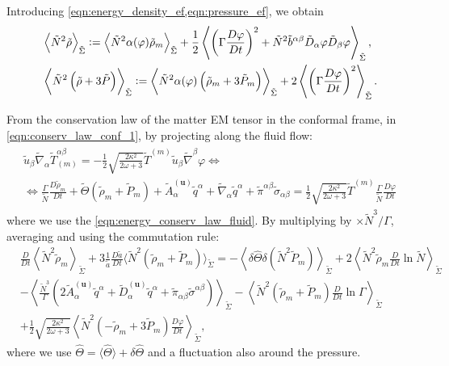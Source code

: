 Introducing \cref{eqn:energy_density_ef,eqn:pressure_ef}, we obtain
\begin{align}
    &\left\langle \Tilde{N}^2\Tilde{\rho}\right\rangle_{\Tilde{\Sigma}} := \left\langle \tilde{N}^2 \alpha(\varphi)\tilde{\rho}_m \right\rangle_{\Tilde{\Sigma}}+\frac{1}{2}\left\langle \left(\Gamma\frac{D\varphi}{Dt}\right)^2+\tilde{N}^2 \tilde{b}^{\alpha\beta}\tilde{D}_\alpha\varphi \tilde{D}_\beta\varphi\right\rangle_{\tilde{\Sigma}}, \\
    &\left\langle \Tilde{N}^2\left(\Tilde{\rho}+3\Tilde{P}\right)\right\rangle_{\Tilde{\Sigma}} := \left\langle \tilde{N}^2 \alpha(\varphi)\left(\tilde{\rho}_m+3\tilde{P}_m\right) \right\rangle_{\Tilde{\Sigma}}+2\left\langle \left(\Gamma\frac{D\varphi}{Dt}\right)^2 \right\rangle_{\tilde{\Sigma}}.
\end{align}

From the conservation law of the matter EM tensor in the conformal frame, in \cref{eqn:conserv_law_conf_1}, by projecting along the fluid flow:
\begin{align}
\begin{gathered}
    \tilde{u}_\beta\tilde{\nabla}_\alpha \tilde{T}_{(m)}^{\alpha\beta}=-\frac{1}{2}\sqrt{\frac{2\kappa^2}{2\omega+3}} \tilde{T}^{(m)} \tilde{u}_\beta\tilde{\nabla}^\beta \varphi \Leftrightarrow\\
    \Leftrightarrow \frac{\Gamma}{\tilde{N}}\frac{D\tilde{\rho}_m}{Dt} + \tilde{\Theta}(\tilde{\rho}_m+\tilde{P}_m) + \tilde{A}^{(\mathbf{u})}_\alpha \tilde{q}^\alpha + \tilde{\nabla}_\alpha \tilde{q}^\alpha +\tilde{\pi}^{\alpha\beta}\tilde{\sigma}_{\alpha\beta}= \frac{1}{2}\sqrt{\frac{2\kappa^2}{2\omega+3}} \tilde{T}^{(m)} \frac{\Gamma}{\tilde{N}}\frac{D\varphi}{Dt}
\end{gathered}
\end{align}
where we use the \cref{eqn:energy_conserv_law_fluid}. By multiplying by $\times \tilde{N}^3/\Gamma$, averaging and using the commutation rule:
\begin{align}
    &\frac{D}{Dt}\left\langle \tilde{N}^2\tilde{\rho}_m\right\rangle_{\tilde{\Sigma}}+3\frac{1}{\tilde{a}}\frac{D\tilde{a}}{Dt}\langle \tilde{N}^2(\tilde{\rho}_m+\tilde{P}_m)\rangle_{\tilde{\Sigma}}=-\left\langle\delta\hat{\Theta}\delta(\tilde{N}^2\tilde{P}_m)\right\rangle_{\tilde{\Sigma}}+2\left\langle \tilde{N}^2\tilde{\rho}_m \frac{D}{Dt}\ln\tilde{N}\right\rangle_{\tilde{\Sigma}}\nonumber\\
    &-\left\langle \frac{\tilde{N}^3}{\Gamma}\left(2\tilde{A}^{(\mathbf{u})}_\alpha \tilde{q}^\alpha+\tilde{D}^{(\mathbf{u})}_\alpha \tilde{q}^\alpha+\tilde{\pi}_{\alpha\beta}\tilde{\sigma}^{\alpha\beta}\right)\right\rangle_{\tilde{\Sigma}}-\left\langle\tilde{N}^2(\tilde{\rho}_m+\tilde{P}_m)\frac{D}{Dt}\ln\Gamma\right\rangle_{\tilde{\Sigma}}\nonumber\\
    &+\frac{1}{2}\sqrt{\frac{2\kappa^2}{2\omega+3}}\left\langle \tilde{N}^2(-\tilde{\rho}_m+3\tilde{P}_m)\frac{D\varphi}{Dt}\right\rangle_{\tilde{\Sigma}},
    \label{eqn:energy_conservation_general_ef}
\end{align}
where we use $\hat{\Theta}=\langle\hat{\Theta}\rangle+\delta\hat{\Theta}$ and a fluctuation also around the pressure.

